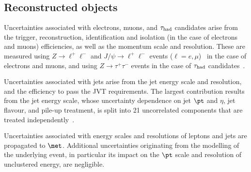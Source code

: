 \subsection{Reconstructed objects}
\label{sec:syst_objects}


Uncertainties associated with electrons, muons, and $\tau_{\mathrm{had}}$ candidates arise from the trigger, reconstruction,  
identification and isolation (in the case of electrons and muons) efficiencies, as well as the momentum scale and resolution. 
These are measured using $Z\to \ell^+\ell^-$ and $J/\psi\to \ell^+\ell^-$ events ($\ell =e, \mu$)~\cite{ATLAS-CONF-2016-024,Aad:2016jkr} 
in the case of electrons and muons, and using $Z\to \tau^+\tau^-$ events in the case of $\tau_{\mathrm{had}}$ candidates~\cite{ATLAS-CONF-2017-029}.

Uncertainties associated with jets arise from the jet energy scale
and resolution, and the efficiency to pass the JVT requirements. 
The largest contribution results from the jet energy scale, whose uncertainty dependence on jet $\pt$ and $\eta$, jet flavour, and pile-up treatment, 
is split into 21 uncorrelated components that are treated independently~\cite{Aaboud:2017jcu}.  

Uncertainties associated with energy scales and resolutions of leptons and jets 
are propagated to $\met$. Additional uncertainties originating from the modelling 
of the underlying event, in particular its impact on the $\pt$ scale and resolution 
of unclustered energy, are negligible.

